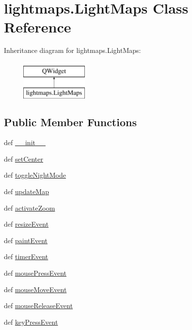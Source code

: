 \hypertarget{classlightmaps_1_1LightMaps}{}\section{lightmaps.\+Light\+Maps Class Reference}
\label{classlightmaps_1_1LightMaps}
Inheritance diagram for lightmaps.\+Light\+Maps\+:\begin{figure}[H]
\begin{center}
\leavevmode
\includegraphics[height=2.000000cm]{classlightmaps_1_1LightMaps}
\end{center}
\end{figure}
\subsection*{Public Member Functions}
\begin{DoxyCompactItemize}
\item 
def \hyperlink{classlightmaps_1_1LightMaps_a28a7f81c00a0d023e8877b7c1e1ffd63}{\+\_\+\+\_\+init\+\_\+\+\_\+}
\item 
def \hyperlink{classlightmaps_1_1LightMaps_addab61c3128119e1709260d3f9658c0d}{set\+Center}
\item 
def \hyperlink{classlightmaps_1_1LightMaps_a3248e51a39961a84a414a325777625ad}{toggle\+Night\+Mode}
\item 
def \hyperlink{classlightmaps_1_1LightMaps_a112fed1a03ce5303f67bf5522fd61734}{update\+Map}
\item 
def \hyperlink{classlightmaps_1_1LightMaps_a4e5ea0a713031f31ca79ccfc81a80984}{activate\+Zoom}
\item 
def \hyperlink{classlightmaps_1_1LightMaps_a2b0e6b76bb1a140419ba9fed520a00ff}{resize\+Event}
\item 
def \hyperlink{classlightmaps_1_1LightMaps_acf2c3c44e5a0558fd42c208e3eb32696}{paint\+Event}
\item 
def \hyperlink{classlightmaps_1_1LightMaps_a0dfadc1ed25c08b719dae95dcee690a2}{timer\+Event}
\item 
def \hyperlink{classlightmaps_1_1LightMaps_ab1db3b15b87db66f7e050c55a2a2e865}{mouse\+Press\+Event}
\item 
def \hyperlink{classlightmaps_1_1LightMaps_ad78c7d5fb20b6037eb3f332bab934aea}{mouse\+Move\+Event}
\item 
def \hyperlink{classlightmaps_1_1LightMaps_a5004ecd012de1841a463355103e4d58b}{mouse\+Release\+Event}
\item 
def \hyperlink{classlightmaps_1_1LightMaps_ae6c9eb1d00d923c81098ffc6be5d0aaf}{key\+Press\+Event}
\end{DoxyCompactItemize}
